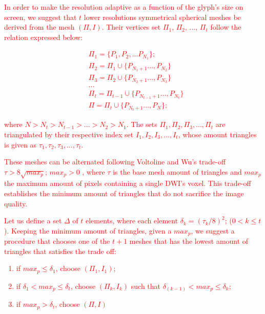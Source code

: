 \documentclass[twoside,twocolumn,10pt]{article}
\begin{document}
\textcolor{red}{In order to make the resolution adaptive as a function of the glyph's size on screen, we suggest that $t$ lower resolutions symmetrical spherical meshes be derived from the mesh $(\Pi, I)$. Their vertices set $\Pi_{1}$, $\Pi_{2}$, ..., $\Pi_{t}$ follow the relation expressed below:}

\textcolor{red}{
\begin{align}
 \label{eq::subset_condition}
    &\Pi_{1} = \{P_1, P_2,... P_{N_1}\}; \nonumber\\
    &\Pi_{2} = \Pi_1 \cup \{ P_{N_1+1}..., P_{N_2}\} \nonumber\\
    &\Pi_{3} = \Pi_2 \cup \{ P_{N_2+1}..., P_{N_3}\} \nonumber\\
    &... \\
    &\Pi_{t} = \Pi_{t-1} \cup \{ P_{N_{t-1}+1}..., P_{N_t}\} \nonumber\\
    &\Pi = \Pi_{t} \cup \{ P_{N_t+1}..., P_{N}\}; \nonumber
\end{align}
}

\textcolor{red}{where $N > N_t > N_{t-1} > ... > N_2 > N_1$. The sets $\Pi_{1}, \Pi_{2}, \Pi_{3}, ..., \Pi_{t}$ are triangulated by their respective index set $I_{1}, I_{2}, I_{3}, ..., I_{t}$, whose amount triangles is given as $\tau_1, \tau_2, \tau_3, ..., \tau_t$.} %

\textcolor{red}{These meshes can be alternated following Voltoline and Wu's trade-off $\tau > 8\sqrt{max_p}$; $max_p > 0$ \cite{voltoline2021}, where $\tau$ is the base mesh amount of triangles and $max_p$ the maximum amount of pixels containing a single DWI's voxel. This trade-off establishes the minimum amount of triangles that do not sacrifice the image quality.}

\textcolor{red}{Let us define a set $\Delta$ of $t$ elements, where each element $\delta_k = (\tau_k/8)^2$; ($0 < k \leq t$). Keeping the minimum amount of triangles, given a $max_p$, we suggest a procedure that chooses one of the $t+1$ meshes that has the lowest amount of triangles that satisfies the trade off:}

\textcolor{red}{
\begin{enumerate}
    \item if $max_p \leq \delta_1$, choose $(\Pi_1, I_1)$;
    \item if $\delta_{1} < max_p \leq \delta_{t}$, choose $(\Pi_k, I_k)$ such that $\delta_{(k-1)} < max_p \leq \delta_{k}$;
    \item if $max_p > \delta_{t}$, choose $(\Pi, I)$
\end{enumerate}
}
\end{document}
